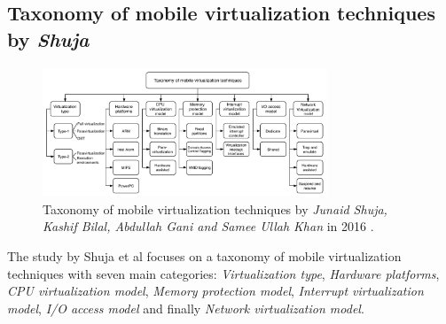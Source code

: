 	\subsection{Taxonomy of mobile virtualization techniques by \textit{Shuja}}
	
	\begin{figure}[H]
		\centering
		\includegraphics[width=8.5cm]{images/Shuja2016.pdf}
		\vspace{-0.2cm}
		\caption{Taxonomy of mobile virtualization techniques by \textit{Junaid Shuja, Kashif Bilal, Abdullah Gani and Samee Ullah Khan} in 2016 \cite{Shuja2016}.}
		\label{fig:TaxonomyByShuja}
	\end{figure}

	The study by Shuja et al \cite{Shuja2016} focuses on a taxonomy of mobile virtualization techniques with seven main categories: \textit{Virtualization type}, \textit{Hardware platforms}, \textit{CPU virtualization model}, \textit{Memory protection model}, \textit{Interrupt virtualization model}, \textit{I/O access model} and finally \textit{Network virtualization model}.
	
	
	
	
	
	